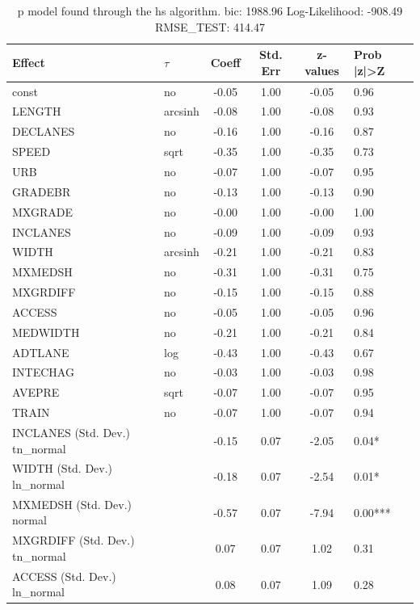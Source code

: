 \begin{table}
	\caption{p model found through the hs algorithm. bic: 1988.96 Log-Likelihood: -908.49 RMSE_TEST: 414.47}
	\begin{center}
		\begin{tabular}{|l|l|c|c|c|l|}
			\hline
			Effect & $\tau$ & Coeff & Std. Err & z-values & Prob |z|>Z \\
			\hline
			const & no & -0.05 & 1.00 & -0.05 & 0.96 \\
			\hline
			LENGTH & arcsinh & -0.08 & 1.00 & -0.08 & 0.93 \\
			\hline
			DECLANES & no & -0.16 & 1.00 & -0.16 & 0.87 \\
			\hline
			SPEED & sqrt & -0.35 & 1.00 & -0.35 & 0.73 \\
			\hline
			URB & no & -0.07 & 1.00 & -0.07 & 0.95 \\
			\hline
			GRADEBR & no & -0.13 & 1.00 & -0.13 & 0.90 \\
			\hline
			MXGRADE & no & -0.00 & 1.00 & -0.00 & 1.00 \\
			\hline
			INCLANES & no & -0.09 & 1.00 & -0.09 & 0.93 \\
			\hline
			WIDTH & arcsinh & -0.21 & 1.00 & -0.21 & 0.83 \\
			\hline
			MXMEDSH & no & -0.31 & 1.00 & -0.31 & 0.75 \\
			\hline
			MXGRDIFF & no & -0.15 & 1.00 & -0.15 & 0.88 \\
			\hline
			ACCESS & no & -0.05 & 1.00 & -0.05 & 0.96 \\
			\hline
			MEDWIDTH & no & -0.21 & 1.00 & -0.21 & 0.84 \\
			\hline
			ADTLANE & log & -0.43 & 1.00 & -0.43 & 0.67 \\
			\hline
			INTECHAG & no & -0.03 & 1.00 & -0.03 & 0.98 \\
			\hline
			AVEPRE & sqrt & -0.07 & 1.00 & -0.07 & 0.95 \\
			\hline
			TRAIN & no & -0.07 & 1.00 & -0.07 & 0.94 \\
			\hline
			INCLANES (Std. Dev.) tn_normal &  & -0.15 & 0.07 & -2.05 & 0.04* \\
			\hline
			WIDTH (Std. Dev.) ln_normal &  & -0.18 & 0.07 & -2.54 & 0.01* \\
			\hline
			MXMEDSH (Std. Dev.) normal &  & -0.57 & 0.07 & -7.94 & 0.00*** \\
			\hline
			MXGRDIFF (Std. Dev.) tn_normal &  & 0.07 & 0.07 & 1.02 & 0.31 \\
			\hline
			ACCESS (Std. Dev.) ln_normal &  & 0.08 & 0.07 & 1.09 & 0.28 \\

\end{tabular}
\end{center}
\end{table}
